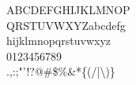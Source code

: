 \documentclass{article}
\begin{document}
\centering
ABCDEFGHIJKLMNOP\\
QRSTUVWXYZabcdefg\\
hijklmnopqrstuvwxyz\\
0123456789\\
.,:;"'!?@\#\$\%\&*\{(/|\textbackslash)\}
\end{document}
